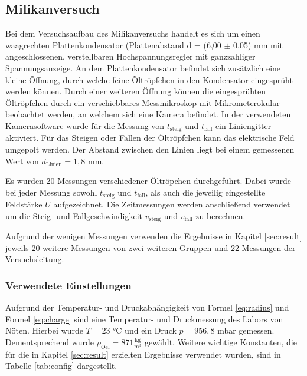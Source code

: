 \documentclass[a4paper,usenatbib]{aspdoc}
\begin{document}
        \subsection{Milikanversuch}
            Bei dem Versuchsaufbau des Milikanversuchs handelt es sich um einen waagrechten Plattenkondensator (Plattenabstand d = (6,00 $\pm$ 0,05) mm mit angeschlossenen, verstellbaren Hochspannungsregler mit ganzzahliger Spannungsanzeige. An dem Plattenkondensator befindet sich zusätzlich eine kleine Öffnung, durch welche feine Öltröpfchen in den Kondensator eingesprüht werden können. Durch einer weiteren Öffnung können die eingesprühten Öltröpfchen durch ein verschiebbares Messmikroskop mit Mikrometerokular beobachtet werden, an welchem sich eine Kamera befindet. In der verwendeten Kamerasoftware wurde für die Messung von $t_{\mathrm{steig}}$ und $t_{\mathrm{fall}}$ ein Liniengitter aktiviert. Für das Steigen oder Fallen der Öltröpfchen kann das elektrische Feld umgepolt werden. Der Abstand zwischen den Linien liegt bei einem gemessenen Wert von $d_{\mathrm{Linien}} = 1,8$ mm.
            
            \noindent Es wurden 20 Messungen verschiedener Öltröpchen durchgeführt. Dabei wurde bei jeder Messung sowohl $t_{\mathrm{steig}}$ und $t_{\mathrm{fall}}$, als auch die jeweilig eingestellte Feldstärke $U$ aufgezeichnet. Die Zeitmessungen werden anschließend verwendet um die Steig- und Fallgeschwindigkeit $v_{\mathrm{steig}}$ und $v_{\mathrm{fall}}$ zu berechnen.
            
            \noindent Aufgrund der wenigen Messungen verwenden die Ergebnisse in Kapitel \ref{sec:result} jeweils 20 weitere Messungen von zwei weiteren Gruppen und 22 Messungen der Versuchsleitung. 
            
            \subsubsection{Verwendete Einstellungen}
                Aufgrund der Temperatur- und Druckabhängigkeit von Formel \ref{eq:radius} und Formel \ref{eq:charge} sind eine Temperatur- und Druckmessung des Labors von Nöten. Hierbei wurde $T = 23$ °C und ein Druck $p = 956,8$ mbar gemessen. Dementsprechend wurde $\rho_{\mathrm{Oel}} = 871 \frac{\mathrm{kg}}{\mathrm{m^3}}$ gewählt. Weitere wichtige Konstanten, die für die in Kapitel \ref{sec:result} erzielten Ergebnisse verwendet wurden, sind in Tabelle \ref{tab:config} dargestellt.
                
\end{document}
